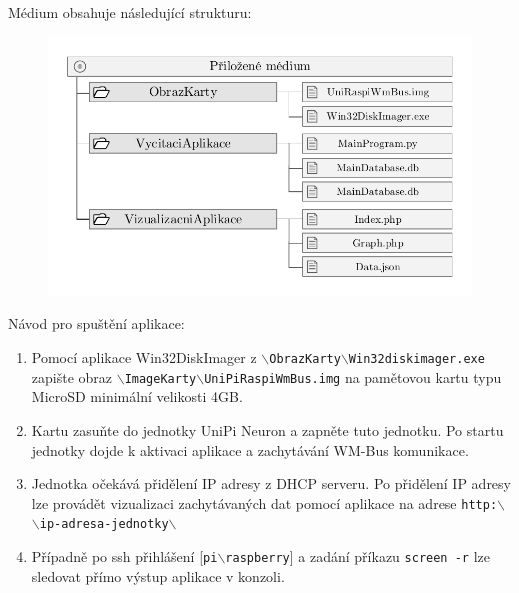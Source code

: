 \vspace{10pt}
Médium obsahuje následující strukturu: 
\vspace{-20pt}
	 \begin{figure}[!h]
  \begin{center}
    \includegraphics[scale=1.0]{obrazky/priloha_medium}
  \end{center}
	\vspace{-30pt}
\end{figure}

Návod pro spuštění aplikace:
		\begin{enumerate}
			\item Pomocí aplikace Win32DiskImager z \texttt{$\backslash$ObrazKarty$\backslash$Win32diskimager.exe} zapište obraz \texttt{$\backslash$ImageKarty$\backslash$UniPiRaspiWmBus.img} na pamětovou kartu typu MicroSD minimální velikosti 4GB.
			\item Kartu zasuňte do jednotky UniPi Neuron a zapněte tuto jednotku. Po startu jednotky dojde k aktivaci aplikace a zachytávání WM-Bus komunikace.
			\item Jednotka očekává přidělení IP adresy z DHCP serveru. Po přidělení IP adresy lze provádět vizualizaci zachytávaných dat pomocí aplikace na adrese \texttt{http:$\backslash$$\backslash$ip-adresa-jednotky$\backslash$}
			\item Případně po ssh přihlášení [\texttt{pi$\backslash$raspberry}] a zadání příkazu \texttt{screen -r} lze sledovat přímo výstup aplikace v konzoli.
		\end{enumerate}



